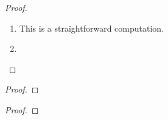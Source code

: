             \begin{proof}
                \begin{enumerate}
                    \item This is a straightforward computation.
                    \item 
                \end{enumerate}
            \end{proof}
        \begin{corollary} \label{coro: pseudo_iwasawa_decompositions}
            
        \end{corollary}
            \begin{proof}
                
            \end{proof}
        \begin{corollary} \label{coro: adjoint_actions_of_pseudo_fixed_point_subalgebras}
        \end{corollary}
            \begin{proof}
                
            \end{proof}
        \begin{corollary}
        \end{corollary}

